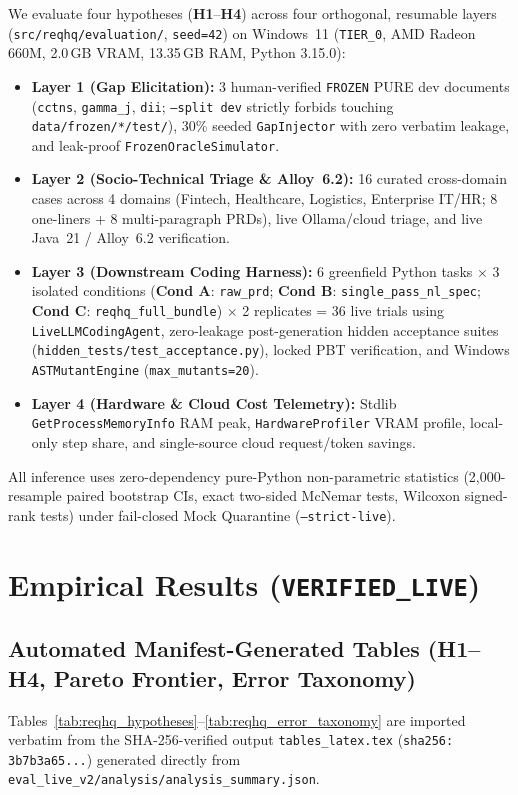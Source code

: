 \documentclass[11pt,a4paper]{article}
\begin{document}
We evaluate four hypotheses (\textbf{H1}--\textbf{H4}) across four orthogonal, resumable layers (\texttt{src/reqhq/evaluation/}, \texttt{seed=42}) on Windows~11 (\texttt{TIER\_0}, AMD Radeon 660M, 2.0\,GB VRAM, 13.35\,GB RAM, Python 3.15.0):
\begin{itemize}
    \item \textbf{Layer 1 (Gap Elicitation):} 3 human-verified \texttt{FROZEN} PURE dev documents (\texttt{cctns}, \texttt{gamma\_j}, \texttt{dii}; \texttt{--split dev} strictly forbids touching \texttt{data/frozen/*/test/}), 30\% seeded \texttt{GapInjector} with zero verbatim leakage, and leak-proof \texttt{FrozenOracleSimulator}.
    \item \textbf{Layer 2 (Socio-Technical Triage \& Alloy~6.2):} 16 curated cross-domain cases across 4 domains (Fintech, Healthcare, Logistics, Enterprise IT/HR; 8 one-liners + 8 multi-paragraph PRDs), live Ollama/cloud triage, and live Java~21 / Alloy~6.2 verification.
    \item \textbf{Layer 3 (Downstream Coding Harness):} 6 greenfield Python tasks $\times$ 3 isolated conditions (\textbf{Cond A}: \texttt{raw\_prd}; \textbf{Cond B}: \texttt{single\_pass\_nl\_spec}; \textbf{Cond C}: \texttt{reqhq\_full\_bundle}) $\times$ 2 replicates = 36 live trials using \texttt{LiveLLMCodingAgent}, zero-leakage post-generation hidden acceptance suites (\texttt{hidden\_tests/test\_acceptance.py}), locked PBT verification, and Windows \texttt{ASTMutantEngine} (\texttt{max\_mutants=20}).
    \item \textbf{Layer 4 (Hardware \& Cloud Cost Telemetry):} Stdlib \texttt{GetProcessMemoryInfo} RAM peak, \texttt{HardwareProfiler} VRAM profile, local-only step share, and single-source cloud request/token savings.
\end{itemize}
All inference uses zero-dependency pure-Python non-parametric statistics (2{,}000-resample paired bootstrap CIs, exact two-sided McNemar tests, Wilcoxon signed-rank tests) under fail-closed Mock Quarantine (\texttt{--strict-live}).

\section{Empirical Results (\texttt{VERIFIED\_LIVE})}

\subsection{Automated Manifest-Generated Tables (H1--H4, Pareto Frontier, Error Taxonomy)}
Tables~\ref{tab:reqhq_hypotheses}--\ref{tab:reqhq_error_taxonomy} are imported verbatim from the SHA-256-verified output \texttt{tables\_latex.tex} (\texttt{sha256: 3b7b3a65...}) generated directly from \texttt{eval\_live\_v2/analysis/analysis\_summary.json}.
\end{document}
